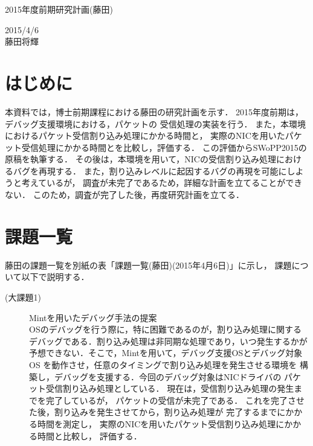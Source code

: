 \documentclass[12pt]{jsarticle}
\begin{document}

\begin{center}
{\LARGE 2015年度前期研究計画(藤田)}
\end{center}

\begin{flushright}
  2015/4/6\\
  藤田将輝
\end{flushright}
\section{はじめに}
本資料では，博士前期課程における藤田の研究計画を示す．
2015年度前期は，デバッグ支援環境における，パケットの
受信処理の実装を行う．
また，本環境におけるパケット受信割り込み処理にかかる時間と，
実際のNICを用いたパケット受信処理にかかる時間とを比較し，評価する．
この評価からSWoPP2015の原稿を執筆する．
その後は，本環境を用いて，NICの受信割り込み処理におけるバグを再現する．
また，割り込みレベルに起因するバグの再現を可能にしようと考えているが，
調査が未完了であるため，詳細な計画を立てることができない．
このため，調査が完了した後，再度研究計画を立てる．

\section{課題一覧}
藤田の課題一覧を別紙の表「課題一覧(藤田)(2015年4月6日)」に示し，
課題について以下で説明する．
\begin{description}
    \item[(大課題1)]Mintを用いたデバッグ手法の提案\\
        OSのデバッグを行う際に，特に困難であるのが，割り込み処理に関する
        デバッグである．割り込み処理は非同期な処理であり，いつ発生するかが
        予想できない．そこで，Mintを用いて，デバッグ支援OSとデバッグ対象OS
        を動作させ，任意のタイミングで割り込み処理を発生させる環境を
        構築し，デバッグを支援する．今回のデバッグ対象はNICドライバの
        パケット受信割り込み処理としている．
        現在は，受信割り込み処理の発生までを完了しているが，
        パケットの受信が未完了である．
        これを完了させた後，割り込みを発生させてから，割り込み処理が
        完了するまでにかかる時間を測定し，
        実際のNICを用いたパケット受信割り込み処理にかかる時間と比較し，
        評価する．
\end{description}
\end{document}
